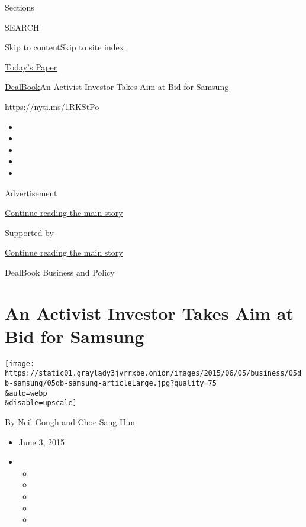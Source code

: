 Sections

SEARCH

\protect\hyperlink{site-content}{Skip to
content}\protect\hyperlink{site-index}{Skip to site index}

\href{https://myaccount.nytimes3xbfgragh.onion/auth/login?response_type=cookie\&client_id=vi}{}

\href{https://www.nytimes3xbfgragh.onion/section/todayspaper}{Today's
Paper}

\href{/section/business/dealbook}{DealBook}\textbar{}An Activist
Investor Takes Aim at Bid for Samsung

\url{https://nyti.ms/1RKStPo}

\begin{itemize}
\item
\item
\item
\item
\item
\end{itemize}

Advertisement

\protect\hyperlink{after-top}{Continue reading the main story}

Supported by

\protect\hyperlink{after-sponsor}{Continue reading the main story}

DealBook Business and Policy

\hypertarget{an-activist-investor-takes-aim-at-bid-for-samsung}{%
\section{An Activist Investor Takes Aim at Bid for
Samsung}\label{an-activist-investor-takes-aim-at-bid-for-samsung}}

\texttt{[image: https://static01.graylady3jvrrxbe.onion/images/2015/06/05/business/05db-samsung/05db-samsung-articleLarge.jpg?quality=75\\\&auto=webp\\\&disable=upscale]}

By \href{http://www.nytimes3xbfgragh.onion/by/neil-gough}{Neil Gough}
and \href{http://www.nytimes3xbfgragh.onion/by/choe-sang-hun}{Choe
Sang-Hun}

\begin{itemize}
\item
  June 3, 2015
\item
  \begin{itemize}
  \item
  \item
  \item
  \item
  \item
  \end{itemize}
\end{itemize}


